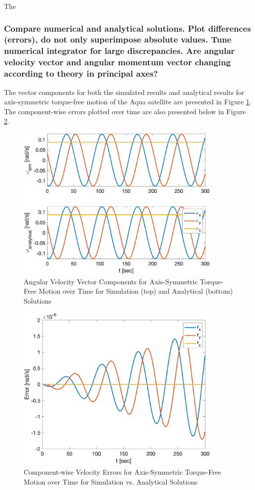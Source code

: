The

\subsubsection{Compare numerical and analytical solutions. Plot differences (errors), do not only superimpose absolute values. Tune numerical integrator for large discrepancies. Are angular velocity vector and angular momentum vector changing according to theory in principal axes?}

The vector components for both the simulated results and analytical results for axis-symmetric torque-free motion of the Aqua satellite are presented in Figure \ref{fig:axis_symmetric_magnitudes}. The component-wise errors plotted over time are also presented below in Figure \ref{fig:axis_symmetric_errors}. 

\begin{figure} [H]
    \centering
    \captionsetup{justification = centering}
    \includegraphics[width = 10cm] {Images/sim_vs_anlt_magnitude.png}
    \caption{Angular Velocity Vector Components for Axis-Symmetric Torque-Free Motion over Time for Simulation (top) and Analytical (bottom) Solutions}
    \label{fig:axis_symmetric_magnitudes}
\end{figure}

\begin{figure} [H]
    \centering
    \captionsetup{justification = centering}
    \includegraphics[width = 10cm] {Images/sim_vs_anlt_error.png}
    \caption{Component-wise Velocity Errors for Axis-Symmetric Torque-Free Motion over Time for Simulation vs. Analytical Solutions}
    \label{fig:axis_symmetric_errors}
\end{figure}

